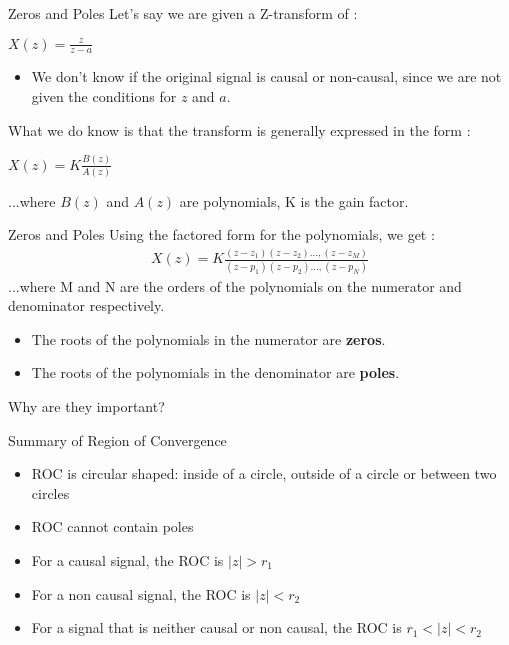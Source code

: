 \documentclass{beamer}
\begin{document}
\begin{frame}{Zeros and Poles}
    Let's say we are given a Z-transform of : \\
    \begin{center}
        $X(z) = \frac{z}{z-a}$ \\
    \end{center}
    
    \begin{itemize}
        \item We don't know if the original signal is causal or non-causal, since we are not given the conditions for $z$ and $a$. 
    \end{itemize}
    
    What we do know is that the transform is generally expressed in the form : \\
    \begin{center}
        $X(z) = K \frac{B(z)}{A(z)}$ 
    \end{center}
    ...where $B(z)$ and $A(z)$ are polynomials, K is the gain factor.
\end{frame}
\begin{frame}{Zeros and Poles}
Using the factored form for the polynomials, we get :
    \begin{align*}
         X(z) = K \frac{(z - z_1)(z - z_2) ..., (z - z_M)}{(z - p_1)(z - p_2) ..., (z - p_N)}
    \end{align*}
    ...where M and N are the orders of the polynomials on the numerator and denominator respectively. \linebreak
    \begin{itemize}
        \item The roots of the polynomials in the numerator are \textbf{zeros}.
        \item The roots of the polynomials in the denominator are \textbf{poles}.
    \end{itemize}
    
    Why are they important?
\end{frame}

\begin{frame}{Summary of Region of Convergence}
    \begin{itemize}
        \item ROC is circular shaped: inside of a circle, outside of a circle or between two circles
        \item ROC cannot contain poles
        \item For a causal signal, the ROC is $|z| > r_1$
        \item For a non causal signal, the ROC is $|z| < r_2$
        \item For a signal that is neither causal or non causal, the ROC is $r_1 < |z| < r_2$
    \end{itemize}
\end{frame}
\end{document}
